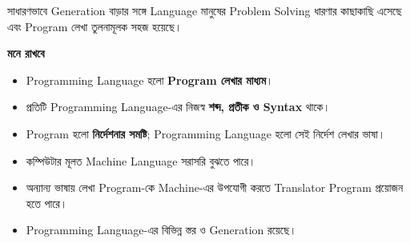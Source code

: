 সাধারণভাবে Generation বাড়ার সঙ্গে Language মানুষের Problem
Solving ধারণার কাছাকাছি এসেছে এবং Program লেখা তুলনামূলক সহজ হয়েছে।

\begin{rememberbox}

\textbf{\color{deepOrange}মনে রাখবে}

\begin{itemize}

\item Programming Language হলো \textbf{Program লেখার মাধ্যম}।

\item প্রতিটি Programming Language-এর নিজস্ব
\textbf{শব্দ, প্রতীক ও Syntax} থাকে।

\item Program হলো \textbf{নির্দেশনার সমষ্টি}; Programming Language
হলো সেই নির্দেশ লেখার ভাষা।

\item কম্পিউটার মূলত Machine Language সরাসরি বুঝতে পারে।

\item অন্যান্য ভাষায় লেখা Program-কে Machine-এর উপযোগী করতে
Translator Program প্রয়োজন হতে পারে।

\item Programming Language-এর বিভিন্ন স্তর ও Generation রয়েছে।

\end{itemize}

\end{rememberbox}

\small

